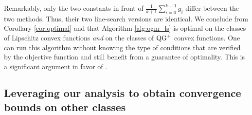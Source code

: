     Remarkably, only the two constants in front of $\frac{1}{k+1}\sum_{i=0}^{k-1} g_i$ differ between the  two methods. Thus, their two line-search versions are identical.
    We conclude from Corollary \ref{cor:optimal} and \citet[Corollary 4]{drori2020efficient} that Algorithm \ref{alg:ogm_ls} is optimal on the classes of Lipschitz convex functions \emph{and} on the classes of $\operatorname{QG}^+$ convex functions.
    One can run this algorithm without knowing the type of conditions that are verified by the objective function and still benefit from a guarantee of optimality. This is a significant argument in favor of .


\subsection{Leveraging our analysis to obtain convergence bounds on other classes}
    
